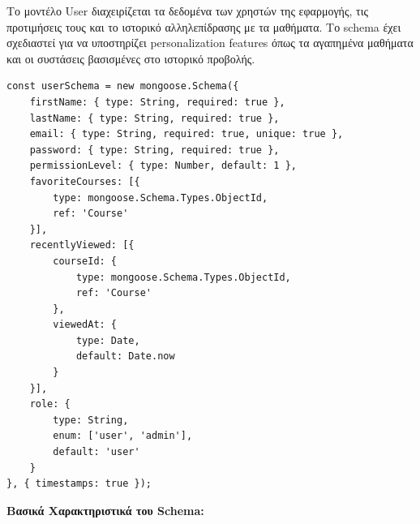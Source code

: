 \documentclass[a4paper,12pt]{article}
\begin{document}
Το μοντέλο User διαχειρίζεται τα δεδομένα των χρηστών της εφαρμογής, τις προτιμήσεις τους και το ιστορικό αλληλεπίδρασης με τα μαθήματα. Το schema έχει σχεδιαστεί για να υποστηρίζει personalization features όπως τα αγαπημένα μαθήματα και οι συστάσεις βασισμένες στο ιστορικό προβολής.

\begin{verbatim}
const userSchema = new mongoose.Schema({
    firstName: { type: String, required: true },
    lastName: { type: String, required: true },
    email: { type: String, required: true, unique: true },
    password: { type: String, required: true },
    permissionLevel: { type: Number, default: 1 },
    favoriteCourses: [{ 
        type: mongoose.Schema.Types.ObjectId, 
        ref: 'Course' 
    }],
    recentlyViewed: [{
        courseId: { 
            type: mongoose.Schema.Types.ObjectId, 
            ref: 'Course' 
        },
        viewedAt: { 
            type: Date, 
            default: Date.now 
        }
    }],
    role: { 
        type: String, 
        enum: ['user', 'admin'], 
        default: 'user' 
    }
}, { timestamps: true });
\end{verbatim}

\textbf{Βασικά Χαρακτηριστικά του Schema:}
\end{document}
